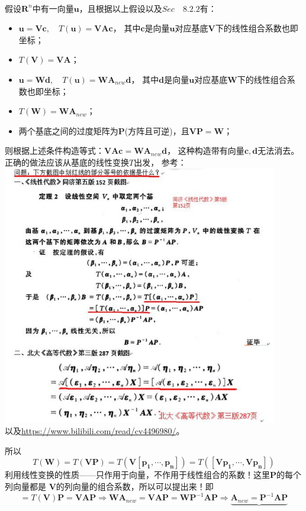 \hspace*{\fill} \\
假设$\boldsymbol{R}^n$中有一向量$\boldsymbol{u}$，且根据以上假设以及$Sec \quad 8.2.2$有：
\begin{itemize}
    \item $\boldsymbol{u}=\boldsymbol{Vc}, \quad T(\boldsymbol{u})= \boldsymbol{VAc}$，
    其中$\boldsymbol{c}$是向量$\boldsymbol{u}$对应基底$\boldsymbol{V}$下的线性组合系数也即坐标；
    \item $T(\boldsymbol{V})=\boldsymbol{VA}$；
    \item $\boldsymbol{u}=\boldsymbol{Wd}, \quad T(\boldsymbol{u})= \boldsymbol{WA}_{new}\boldsymbol{d}$，
    其中$\boldsymbol{d}$是向量$\boldsymbol{u}$对应基底$\boldsymbol{W}$下的线性组合系数也即坐标；
    \item $T(\boldsymbol{W})=\boldsymbol{WA}_{new}$；
    \item 两个基底之间的过度矩阵为$\boldsymbol{P}$(方阵且可逆)，且$\boldsymbol{VP=W}$；
\end{itemize}
则根据上述条件构造等式：\sout{$\boldsymbol{VAc}= \boldsymbol{WA}_{new}\boldsymbol{d}$}，
这种构造带有向量$\boldsymbol{c,d}$无法消去。正确的做法应该从基底的线性变换$T$出发，
参考：\\
\includegraphics[width=0.90\textwidth]{similarproof.jpg}
\\
以及\url{https://www.bilibili.com/read/cv4496980/}。

所以
$$
T(\boldsymbol{W})=T(\boldsymbol{VP})= T(\boldsymbol{V [p_1,\cdots,p_n]})
=T(\boldsymbol{ [Vp_1,\cdots,Vp_n]})
$$
利用线性变换的性质——只作用于向量，不作用于线性组合的系数！这里$\boldsymbol{P}$的每个列向量都是
$\boldsymbol{V}$的列向量的组合系数，所以可以提出来！即
$$
=T(\boldsymbol{V})\boldsymbol{P}=\boldsymbol{VAP}\Rightarrow
\boldsymbol{WA}_{new}=\boldsymbol{VAP}=\boldsymbol{W}\boldsymbol{P}^{-1}\boldsymbol{AP}
\Rightarrow \underbrace{\boldsymbol{A}_{new}= \boldsymbol{P}^{-1}\boldsymbol{AP}}
$$

